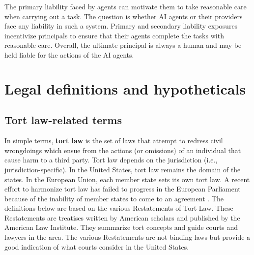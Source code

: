 \documentclass[11pt]{article}
\begin{document}
The primary liability faced by agents can motivate them to take reasonable care when carrying out a task.  The question is whether AI agents or their providers face any liability in such a system.  Primary and secondary liability exposures incentivize principals to ensure that their agents complete the tasks with reasonable care. Overall, the ultimate principal is always a human and may be held liable for the actions of the AI agents.

\section{Legal definitions and hypotheticals}
\label{sec:legdef}

\subsection{Tort law-related terms}
In simple terms, \textbf{tort law} is the set of laws that attempt to redress civil wrongdoings which ensue from the actions (or omissions) of an individual that cause harm to a third party.  Tort law depends on the jurisdiction (i.e., jurisdiction-specific). In the United States, tort law remains the domain of the states. In the European Union, each member state sets its own tort law. A recent effort to harmonize tort law has failed to progress in the European Parliament because of the inability of member states to come to an agreement \citep{libert_ai_2025}. The definitions below are based on the various Restatements of Tort Law.  These Restatements are treatises written by American scholars and published by the American Law Institute.  They summarize tort concepts and guide courts and lawyers in the area.  The various Restatements \citep{rest_tort_2,rest_tort_3} are not binding laws but provide a good indication of what courts consider in the United States.
\end{document}
